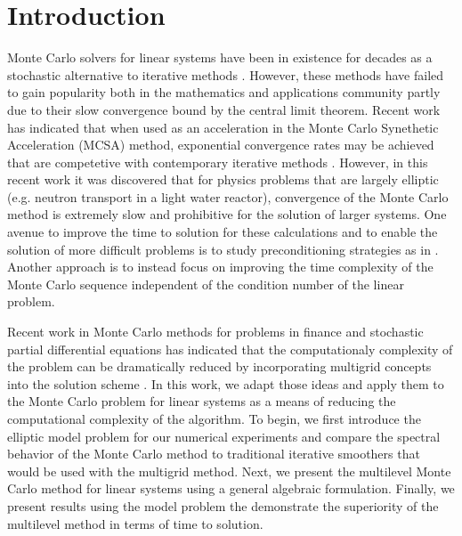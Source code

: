 \documentclass[note]{TechNote}
\begin{document}
\section{Introduction}
\label{sec:introduction}
Monte Carlo solvers for linear systems have been in existence for
decades as a stochastic alternative to iterative methods
\cite{forsythe_matrix_1950,wasow_note_1952,halton_sequential_1962,hammersley_monte_1964,spanier_monte_1969}. However,
these methods have failed to gain popularity both in the mathematics
and applications community partly due to their slow convergence bound
by the central limit theorem. Recent work has indicated that when used
as an acceleration in the Monte Carlo Synethetic Acceleration (MCSA)
method, exponential convergence rates may be achieved that are
competetive with contemporary iterative methods
\cite{evans_residual_2003,evans_monte_2009,evans_monte_2012,slattery_phd_2013}.
However, in this recent work it was discovered that for physics
problems that are largely elliptic (e.g. neutron transport in a light
water reactor), convergence of the Monte Carlo method is extremely
slow and prohibitive for the solution of larger systems. One avenue to
improve the time to solution for these calculations and to enable the
solution of more difficult problems is to study preconditioning
strategies as in \cite{slattery_phd_2013}. Another approach is to
instead focus on improving the time complexity of the Monte Carlo
sequence independent of the condition number of the linear problem.

Recent work in Monte Carlo methods for problems in finance and
stochastic partial differential equations has indicated that the
computationaly complexity of the problem can be dramatically reduced
by incorporating multigrid concepts into the solution scheme
\cite{heinrich_2001,giles_2008,cliffe_2011}. In this work, we adapt
those ideas and apply them to the Monte Carlo problem for linear
systems as a means of reducing the computational complexity of the
algorithm. To begin, we first introduce the elliptic model problem for
our numerical experiments and compare the spectral behavior of the
Monte Carlo method to traditional iterative smoothers that would be
used with the multigrid method. Next, we present the multilevel Monte
Carlo method for linear systems using a general algebraic
formulation. Finally, we present results using the model problem the
demonstrate the superiority of the multilevel method in terms of time
to solution.

\end{document}

